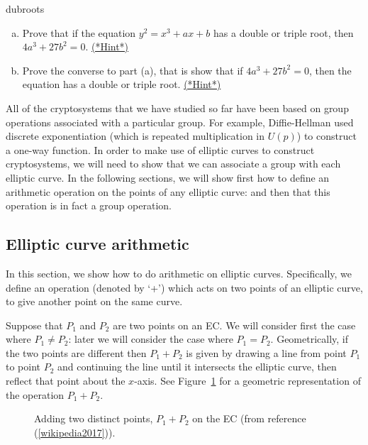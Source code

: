 \begin{exercise}{dubroots}
		\begin{enumerate}[(a)] 
	\item  Prove that if the equation $y^2 = x^3 + ax + b$ has a double or triple root, then $4a^3+27b^2=0$. 
\hyperref[sec:further_crypt:hints]{(*Hint*)}
	\item Prove the converse to part (a), that is show that if $4a^3 + 27b ^2=0$, then the equation has a double or triple root. \hyperref[sec:further_crypt:hints]{(*Hint*)}
\end {enumerate} 
\end{exercise}

All of the cryptosystems that we have studied so far have been based on group operations associated with a particular group. For example, Diffie-Hellman used discrete exponentiation (which is repeated multiplication in $U(p)$) to construct a one-way function. In order to make use of elliptic curves to construct cryptosystems, we will need to show that we can associate a group with each elliptic curve. In the following sections, we will show first how to define an arithmetic operation on the points of  any  elliptic curve: and then that this operation is in fact a group operation.

\subsection{Elliptic curve arithmetic}\label{sec:ECA}
In this section, we show how to do arithmetic on elliptic curves. Specifically, we define an operation (denoted by `+') which acts on two points of an elliptic curve, to give another point on the same curve. 

Suppose that $P_1$ and $P_2$ are two points on an EC. We will consider first the case where $P_1 \neq P_2$: later we will consider the case where  $P_1= P_2$. Geometrically, if the two points are different then $P_1 + P_2$ is given by drawing a line from point $P_1$ to point $P_2$ and continuing the line until it intersects the elliptic curve, then reflect that point about the $x$-axis.  See Figure~\ref{fig:DH:DHKE_6} for a geometric representation of the operation $P_1+P_2$.

\begin{figure}[htbp]
	  \caption{\label{fig:DH:DHKE_6}Adding two distinct points, $P_1 + P_2$ on the EC (from reference (\ref{wikipedia2017})).}
\end{figure}

